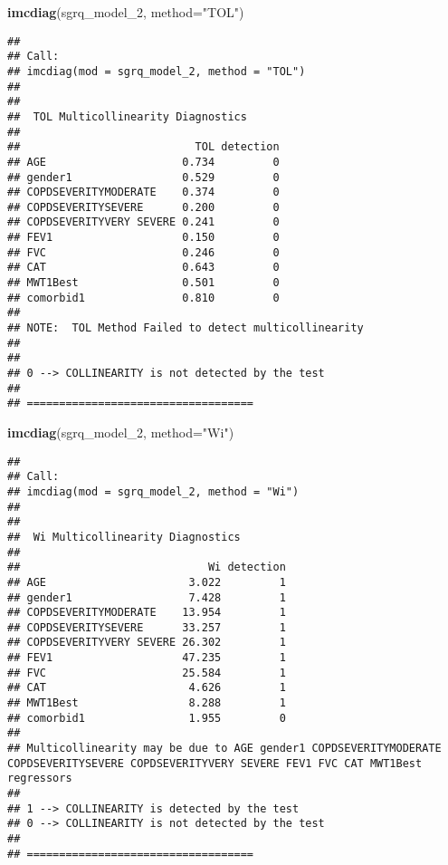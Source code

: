 \documentclass[
]{article}
\newenvironment{Shaded}{\begin{snugshade}}{\end{snugshade}}
\newcommand{\AttributeTok}[1]{\textcolor[rgb]{0.13,0.29,0.53}{#1}}
\newcommand{\FunctionTok}[1]{\textcolor[rgb]{0.13,0.29,0.53}{\textbf{#1}}}
\newcommand{\NormalTok}[1]{#1}
\newcommand{\StringTok}[1]{\textcolor[rgb]{0.31,0.60,0.02}{#1}}
\begin{document}
\begin{Shaded}
\begin{Highlighting}[]
\FunctionTok{imcdiag}\NormalTok{(sgrq\_model\_2, }\AttributeTok{method=}\StringTok{"TOL"}\NormalTok{)}
\end{Highlighting}
\end{Shaded}

\begin{verbatim}
## 
## Call:
## imcdiag(mod = sgrq_model_2, method = "TOL")
## 
## 
##  TOL Multicollinearity Diagnostics
## 
##                           TOL detection
## AGE                     0.734         0
## gender1                 0.529         0
## COPDSEVERITYMODERATE    0.374         0
## COPDSEVERITYSEVERE      0.200         0
## COPDSEVERITYVERY SEVERE 0.241         0
## FEV1                    0.150         0
## FVC                     0.246         0
## CAT                     0.643         0
## MWT1Best                0.501         0
## comorbid1               0.810         0
## 
## NOTE:  TOL Method Failed to detect multicollinearity
## 
## 
## 0 --> COLLINEARITY is not detected by the test
## 
## ===================================
\end{verbatim}

\begin{Shaded}
\begin{Highlighting}[]
\FunctionTok{imcdiag}\NormalTok{(sgrq\_model\_2, }\AttributeTok{method=}\StringTok{"Wi"}\NormalTok{)}
\end{Highlighting}
\end{Shaded}

\begin{verbatim}
## 
## Call:
## imcdiag(mod = sgrq_model_2, method = "Wi")
## 
## 
##  Wi Multicollinearity Diagnostics
## 
##                             Wi detection
## AGE                      3.022         1
## gender1                  7.428         1
## COPDSEVERITYMODERATE    13.954         1
## COPDSEVERITYSEVERE      33.257         1
## COPDSEVERITYVERY SEVERE 26.302         1
## FEV1                    47.235         1
## FVC                     25.584         1
## CAT                      4.626         1
## MWT1Best                 8.288         1
## comorbid1                1.955         0
## 
## Multicollinearity may be due to AGE gender1 COPDSEVERITYMODERATE COPDSEVERITYSEVERE COPDSEVERITYVERY SEVERE FEV1 FVC CAT MWT1Best regressors
## 
## 1 --> COLLINEARITY is detected by the test 
## 0 --> COLLINEARITY is not detected by the test
## 
## ===================================
\end{verbatim}
\end{document}

